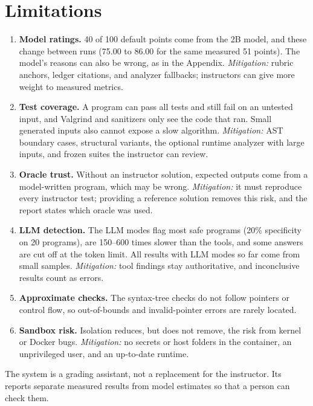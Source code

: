 \documentclass[conference]{IEEEtran}
\begin{document}
\section{Limitations}
\begin{enumerate}
  \item \textbf{Model ratings.} 40 of 100 default points come from the 2B
        model, and these change between runs (75.00 to 86.00 for the same
        measured 51 points). The model's reasons can also be wrong, as in the
        Appendix. \emph{Mitigation:} rubric anchors, ledger citations, and
        analyzer fallbacks; instructors can give more weight to measured metrics.
  \item \textbf{Test coverage.} A program can pass all tests and still fail on
        an untested input, and Valgrind and sanitizers only see the code that
        ran. Small generated inputs also cannot expose a slow algorithm.
        \emph{Mitigation:} AST boundary cases, structural variants, the optional
        runtime analyzer with large inputs, and frozen suites the instructor can
        review.
  \item \textbf{Oracle trust.} Without an instructor solution, expected outputs
        come from a model-written program, which may be wrong.
        \emph{Mitigation:} it must reproduce every instructor test; providing a
        reference solution removes this risk, and the report states which oracle
        was used.
  \item \textbf{LLM detection.} The LLM modes flag most safe programs (20\%
        specificity on 20 programs), are 150--600 times slower than the tools,
        and some answers are cut off at the token limit. All results with LLM
        modes so far come from small samples. \emph{Mitigation:} tool findings
        stay authoritative, and inconclusive results count as errors.
  \item \textbf{Approximate checks.} The syntax-tree checks do not follow
        pointers or control flow, so out-of-bounds and invalid-pointer errors are
        rarely located.
  \item \textbf{Sandbox risk.} Isolation reduces, but does not remove, the risk
        from kernel or Docker bugs. \emph{Mitigation:} no secrets or host
        folders in the container, an unprivileged user, and an up-to-date
        runtime.
\end{enumerate}
The system is a grading assistant, not a replacement for the instructor. Its
reports separate measured results from model estimates so that a person can check
them.
\end{document}
